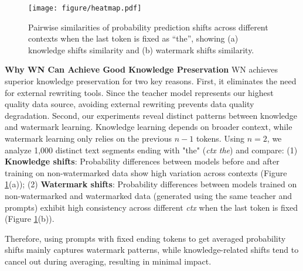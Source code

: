 \vspace{3pt}
\begin{figure}[t]
    \centering
    \texttt{[image: figure/heatmap.pdf]}
    \caption{Pairwise similarities of probability prediction shifts across different contexts when the last token is fixed as ``the'', showing (a) knowledge shifts similarity and (b) watermark shifts similarity.}
    \label{fig:heatmap}
    \vspace{-15pt}
\end{figure}

\noindent\textbf{Why WN Can Achieve Good Knowledge Preservation} \quad WN achieves superior knowledge preservation for two key reasons. First, it eliminates the need for external rewriting tools. Since the teacher model represents our highest quality data source, avoiding external rewriting prevents data quality degradation. Second, our experiments reveal distinct patterns between knowledge and watermark learning. Knowledge learning depends on broader context, while watermark learning only relies on the previous $n-1$ tokens. Using $n=2$, we analyze 1,000 distinct text segments ending with "the" (\textit{ctx the}) and compare:
(1) \textbf{Knowledge shifts}: Probability differences between models before and after training on non-watermarked data show high variation across contexts (Figure \ref{fig:heatmap}(a)); (2) \textbf{Watermark shifts}: Probability differences between models trained on non-watermarked and watermarked data (generated using the same teacher and prompts) exhibit high consistency across different \textit{ctx} when the last token is fixed (Figure \ref{fig:heatmap}(b)).

Therefore, using prompts with fixed ending tokens to get averaged probability shifts mainly captures watermark patterns, while knowledge-related shifts tend to cancel out during averaging, resulting in minimal impact.

